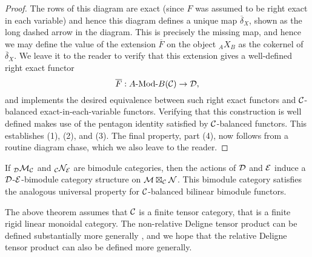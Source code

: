 \documentclass{amsart}
\begin{document}
\begin{proof}
The rows of this diagram are exact (since $F$ was assumed to be right exact in each variable) and hence this diagram defines a unique map $\overline{\delta}_X$, shown as the long dashed arrow in the diagram. This is precisely the missing map, and hence we may define the value of the extension $\overline{F}$ on the object ${}_AX_B$ as the cokernel of $\overline{\delta}_X$. We leave it to the reader to verify that this extension gives a well-defined right exact functor 
\begin{equation*}
	\overline{F}: \Mod{A}{B}(\cC) \to \cD,
\end{equation*} 
and implements the desired equivalence between such right exact functors and $\mathcal C$-balanced exact-in-each-variable functors. Verifying that this construction is well defined makes use of the pentagon identity satisfied by $\mathcal C$-balanced functors. This establishes (1), (2), and (3). The final property, part (4), now follows from a routine diagram chase, which we also leave to the reader. 
\end{proof}

\begin{remark}
	If ${}_{\mathcal D}\mathcal M_{\mathcal C}$ and ${}_{\mathcal C}\mathcal N_{\mathcal E}$ are bimodule categories, then the actions of $\mathcal D$ and $\mathcal E$ induce a $\mathcal D$-$\mathcal E$-bimodule category structure on $\mathcal M \boxtimes_{\mathcal C} \mathcal N$. This bimodule category satisfies the analogous universal property for $\mathcal C$-balanced bilinear bimodule functors. 
\end{remark}

\begin{remark}
The above theorem assumes that $\mathcal C$ is a finite tensor category, that is a finite rigid linear monoidal category.  The non-relative Deligne tensor product can be defined substantially more generally \cite{1212.1545}, and we hope that the relative Deligne tensor product can also be defined more generally.
\end{remark}

















\end{document}
